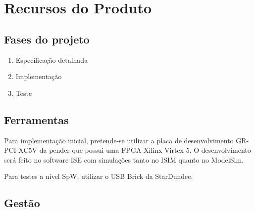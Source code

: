 \chapter{Recursos do Produto}

\section{Fases do projeto}

\begin{enumerate}
	\item Especificação detalhada
	\item Implementação
	\item Teste 
\end{enumerate}

\section{Ferramentas}

Para implementação inicial, pretende-se utilizar a placa de desenvolvimento GR-PCI-XC5V da pender que possui uma FPGA Xilinx Virtex 5. O desenvolvimento será feito no software ISE com simulações tanto no ISIM quanto no ModelSim.

Para testes a nível SpW, utilizar o USB Brick da StarDundee.

\section{Gestão}



	\apptocmd{\thebibliography}{\footnotesize}{}{}
	
	





